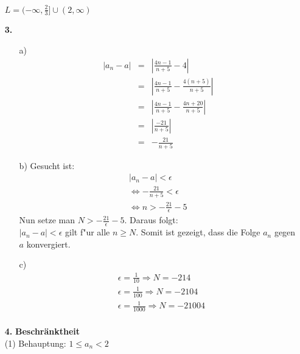 \documentclass [a4paper,11pt]{article}
\begin{document}
\begin{enumerate}
            $L = (- \infty, \frac{2}{3}] \cup (2, \infty)$
        \item[\textbf{3.}]
            \begin{enumerate}
                \item[a)]
                    \begin{align}
                        |a_n - a| &=& |\frac{4n-1}{n+5} - 4| \\
                        &=& |\frac{4n-1}{n+5} - \frac{4(n+5)}{n+5}| \\
                        &=& |\frac{4n-1}{n+5} - \frac{4n+20}{n+5}| \\
                        &=& |\frac{-21}{n+5}| \\
                        &=& - \frac{21}{n+5}
                    \end{align}
                \item[b)]
                    Gesucht ist:
                    \begin{align}
                        |a_n - a| < \epsilon \\
                        \Leftrightarrow - \frac{21}{n+5} < \epsilon \\
                        \Leftrightarrow n > - \frac{21}{\epsilon} -5
                    \end{align}
                    Nun setze man $N > - \frac{21}{\epsilon} -5$. Daraus folgt: \\
                    $|a_n - a| < \epsilon$ gilt f"ur alle $n \geq N$.
                    Somit ist gezeigt, dass die Folge $a_n$ gegen $a$ konvergiert.
                \item[c)]
                    \begin{align}
                        & \epsilon = \frac{1}{10} \Rightarrow N = -214 \\
                        & \epsilon = \frac{1}{100} \Rightarrow N = -2104 \\
                        & \epsilon = \frac{1}{1000} \Rightarrow N = -21004 \\
                    \end{align}
            \end{enumerate}
        \item[\textbf{4.}]
            \textbf{Beschränktheit}\\
                (1) Behauptung: $1 \leq a_n < 2$ \\

\end{enumerate}
\end{document}
